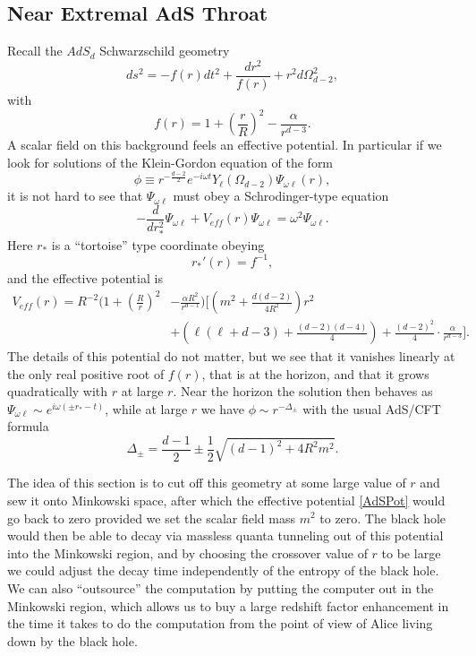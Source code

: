 \documentclass[12pt]{article}
\newcommand{\be}{\begin{equation}}
\newcommand{\ee}{\end{equation}}
\begin{document}
\subsection{Near Extremal AdS Throat}
Recall the $AdS_d$ Schwarzschild geometry
\be\label{AdSsch}
ds^2=-f(r)dt^2+\frac{dr^2}{f(r)}+r^2d\Omega_{d-2}^2,
\ee
with
\be
f(r)=1+\left(\frac{r}{R}\right)^2-\frac{\alpha}{r^{d-3}}.
\ee
A scalar field on this background feels an effective potential.  In particular if we look for solutions of the Klein-Gordon equation of the form
\be
\phi\equiv r^{-\frac{d-2}{2}}e^{-i\omega t}Y_{\ell}(\Omega_{d-2})\Psi_{\omega \ell}(r),
\ee
it is not hard to see that $\Psi_{\omega \ell}$ must obey a Schrodinger-type equation
\be
-\frac{d}{dr_*^2}\Psi_{\omega \ell}+V_{eff}(r)\Psi_{\omega\ell}=\omega^2 \Psi_{\omega \ell}.
\ee
Here $r_*$ is a ``tortoise'' type coordinate obeying
\be
r_*'(r)=f^{-1},
\ee
and the effective potential is
\begin{align}\nonumber
V_{eff}(r)=R^{-2}\bigg(1+\left(\frac{R}{r}\right)^2&-\frac{\alpha R^2}{r^{d-1}}\bigg)\bigg[\left(m^2+\frac{d(d-2)}{4R^2}\right)r^2\\
&+\left(\ell(\ell+d-3)+\frac{(d-2)(d-4)}{4}\right)+\frac{(d-2)^2}{4}\cdot \frac{\alpha}{r^{d-3}}\bigg].\label{AdSPot}
\end{align}
The details of this potential do not matter, but we see that it vanishes linearly at the only real positive root of $f(r)$, that is at the horizon, and that it grows quadratically with $r$ at large $r$. Near the horizon the solution then behaves as $\Psi_{\omega\ell}\sim e^{i\omega(\pm r_*-t)}$, while at large $r$ we have $\phi\sim r^{-\Delta_{\pm}}$ with the usual AdS/CFT formula
\be
\Delta_{\pm}=\frac{d-1}{2}\pm\frac{1}{2}\sqrt{(d-1)^2+4R^2m^2}.
\ee

The idea of this section is to cut off this geometry at some large value of $r$ and sew it onto Minkowski space, after which the effective potential \eqref{AdSPot} would go back to zero provided we set the scalar field mass $m^2$ to zero.  The black hole would then be able to decay via massless quanta tunneling out of this potential into the Minkowski region, and by choosing the crossover value of $r$ to be large we could adjust the decay time independently of the entropy of the black hole.  We can also ``outsource'' the computation by putting the computer out in the Minkowski region, which allows us to buy a large redshift factor enhancement in the time it takes to do the computation from the point of view of Alice living down by the black hole.  
\end{document}
